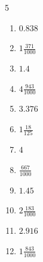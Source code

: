 \documentclass[12pt]{article}
\begin{document}
\begin{multicols}{5}
\begin{enumerate}
\item $ 0.838 $
\item $ 1 \frac{371}{1000} $
\item $ 1.4 $
\item $ 4 \frac{943}{1000} $
\item $ 3.376 $
\item $ 1 \frac{18}{125} $
\item $ 4 $
\item $ \frac{667}{1000} $
\item $ 1.45 $
\item $ 2 \frac{183}{1000} $
\item $ 2.916 $
\item $ 1 \frac{843}{1000} $
\end{enumerate}\end{multicols}\newpage
\end{document}
